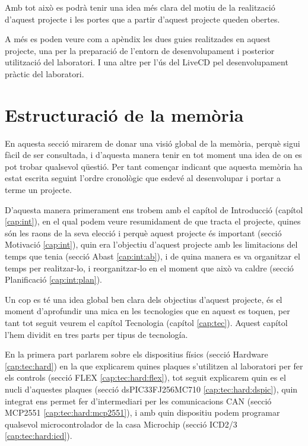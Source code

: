 Amb tot això es podrà tenir una idea més clara del motiu de la realització d'aquest projecte i les portes que a partir d'aquest projecte queden obertes.

A més es poden veure com a apèndix les dues guies realitzades en aquest projecte, una per la preparació de l'entorn de desenvolupament i posterior utilització del laboratori. I una altre per l'ús del LiveCD  pel desenvolupament pràctic del laboratori.

\section{Estructuració de la memòria}\label{cap:int:estruct}

En aquesta secció mirarem de donar una visió global de la memòria, perquè sigui fàcil de ser consultada, i d'aquesta manera tenir en tot moment una idea de on es pot trobar qualsevol qüestió. Per tant començar indicant que aquesta memòria ha estat escrita seguint l'ordre cronològic que esdevé al desenvolupar i portar a terme un projecte.

D'aquesta manera primerament ens trobem  amb el capítol de Introducció (capítol \ref{cap:int}), en el qual podem veure resumidament de que tracta el projecte, quines són les raons de la seva elecció i perquè aquest projecte és important (secció Motivació \ref{cap:int}), quin era l'objectiu d'aquest projecte amb les limitacions del temps que tenia (secció Abast \ref{cap:int:ab}), i de quina manera es va organitzar el temps per realitzar-lo, i reorganitzar-lo en el moment que això va caldre (secció Planificació \ref{cap:int:plan}).

Un cop es té una idea global ben clara dels objectius d'aquest projecte, és el moment d'aprofundir una mica en les tecnologies que en aquest es toquen, per tant tot seguit veurem el capítol Tecnologia (capítol \ref{cap:tec}). Aquest capítol l'hem dividit en tres parts per tipus de tecnología. 

En la primera part parlarem sobre els dispositius físics (secció Hardware \ref{cap:tec:hard}) en la que explicarem quines plaques s'utilitzen al laboratori per fer els controls (secció FLEX \ref{cap:tec:hard:flex}), tot seguit explicarem quin es el nucli d'aquestes plaques (secció dsPIC33FJ256MC710 \ref{cap:tec:hard:dspic}), quin integrat ens permet fer d'intermediari per les comunicacions CAN (secció MCP2551 \ref{cap:tec:hard:mcp2551}), i amb quin dispositiu podem programar qualsevol microcontrolador de la casa Microchip (secció ICD2/3 \ref{cap:tec:hard:icd}).


